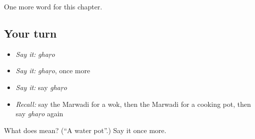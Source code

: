 \begin{grammarlens}[title={What you've built}]
One more word for this chapter.
\end{grammarlens}

\subsection*{Your turn}
\begin{itemize}
\raggedright
  \item \emph{Say it:} \emph{ghaṛo}
  \item \emph{Say it:} \emph{ghaṛo}, once more
  \item \emph{Say it:} say \emph{ghaṛo}
  \item \emph{Recall:} say the Marwadi for a wok, then the Marwadi for a cooking pot, then say \emph{ghaṛo} again
\end{itemize}

\begin{tcolorbox}[breakable,colback=teal!4,colframe=teal!35!black,title={Before you move on}]
What does  mean? (\textquotedblleft{}A water pot\textquotedblright{}.) Say it once more.
\end{tcolorbox}
